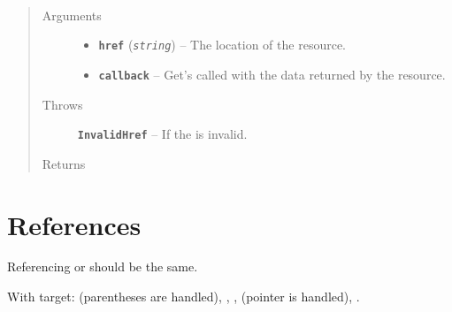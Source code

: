 \documentclass[letterpaper,10pt,english]{sphinxmanual}
\begin{document}

\begin{fulllineitems}
\label{objects:bar.baz}~\begin{quote}\begin{description}
\item[{Arguments}] \leavevmode\begin{itemize}
\item {} 
\textbf{\texttt{href}} (\emph{\texttt{string}}) -- The location of the resource.

\item {} 
\textbf{\texttt{callback}} -- Get's called with the data returned by the resource.

\end{itemize}

\item[{Throws}] \leavevmode
\textbf{\texttt{InvalidHref}} -- If the  is invalid.

\item[{Returns}] \leavevmode
{}

\end{description}\end{quote}

\end{fulllineitems}


\begin{fulllineitems}
\label{objects:bar.spam}
\end{fulllineitems}



\chapter{References}
\label{objects:references}
Referencing {\hyperref[objects:mod.Cls]{}} or {\hyperref[objects:mod.Cls]{}} should be the same.

With target: {\hyperref[objects:c.Sphinx_DoSomething]{}} (parentheses are handled),
{\hyperref[objects:c.SphinxStruct.member]{}}, {\hyperref[objects:c.SPHINX_USE_PYTHON]{}},
{\hyperref[objects:c.SphinxType]{}} (pointer is handled), {\hyperref[objects:c.sphinx_global]{}}.
\end{document}
